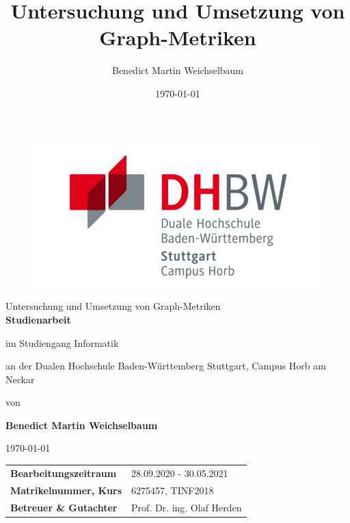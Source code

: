 \documentclass[a4paper,12pt,ngerman,chapterprefix=false,listof=totoc,bibliography=totoc]{scrreprt}
\begin{document}
\title{\Large{Untersuchung und Umsetzung von Graph-Metriken
}}
\author{Benedict Martin Weichselbaum}
\date{\today}
\begin{titlepage}
	\centering\hspace{8mm}
	\begin{figure}
		\centering
			\includegraphics[scale=1.3]{./Abbildungen/dhbwlogo.png}
	\end{figure}
	
	\vspace{5mm}	
	{\fontsize{26}{40}\selectfont
	Untersuchung und Umsetzung von Graph-Metriken
	}
	\\
	\vspace{2cm}
	\textbf{\Large{Studienarbeit}} \par
	\vspace{1cm}
	im Studiengang Informatik \par
	\vspace{0.3cm}
	an der Dualen Hochschule Baden-Württemberg Stuttgart, Campus Horb am Neckar \par
	\vspace{1.2cm}
	von \par
	\vspace{0.5cm}
	\textbf{\large{Benedict Martin Weichselbaum}} \par
	\vspace{1.5cm}
	{\today}\par
	\vfill
	\begin{table}[ht]
		\hspace{1,5cm}
		\begin{tabular}{p{7cm}p{7cm}}
			\textbf{Bearbeitungszeitraum} & 28.09.2020 - 30.05.2021\\
			\textbf{Matrikelnummer, Kurs} & 6275457, TINF2018\\
			\textbf{Betreuer \& Gutachter} & Prof. Dr. ing. Olaf Herden\\
		\end{tabular}
	\end{table}
\end{titlepage}
\end{document}
